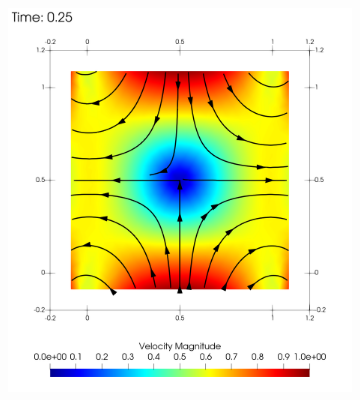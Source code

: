 \begin{figure}
\begin{centering}
\begin{subfigure}{0.45\textwidth}
\begin{centering}
                            \includegraphics[width=\textwidth]{diagrams/results-contractions/mm_5_black.0025.png}
                            \caption{}
                            \label{fig:square-solid-wall-flow:25}
                        \end{centering}
                    \end{subfigure}
                    \begin{subfigure}{0.45\textwidth}
                        \begin{centering}

\end{centering}
\end{subfigure}
\end{centering}
\end{figure}
